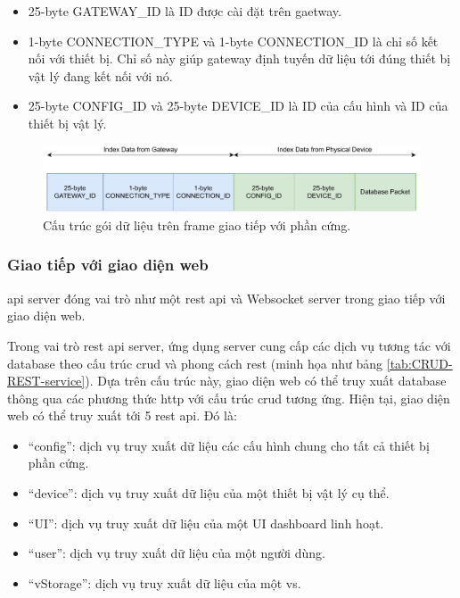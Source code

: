 \begin{itemize}
    \item 25-byte GATEWAY\_ID là ID được cài đặt trên gaetway.
    \item 1-byte CONNECTION\_TYPE và 1-byte CONNECTION\_ID là chỉ số kết nối với thiết bị. Chỉ số này giúp gateway định tuyến dữ liệu tới đúng thiết bị vật lý đang kết nối với nó.
    \item 25-byte CONFIG\_ID và 25-byte DEVICE\_ID là ID của cấu hình và ID của thiết bị vật lý.
\end{itemize}

\begin{figure}[htp]
\centering
\includegraphics[width=1.0\linewidth]{images/Thesis-Page-12-Hardware-data-frame-struct.pdf}
\caption{Cấu trúc gói dữ liệu trên frame giao tiếp với phần cứng.}
\label{fig:Hardware-data-frame-struct}
\end{figure}

\subsubsection{Giao tiếp với giao diện web}

\acrshort{api} server đóng vai trò như một \acrfull{rest} \acrshort{api} và Websocket server trong giao tiếp với giao diện web.

Trong vai trò \acrshort{rest} \acrshort{api} server, ứng dụng server cung cấp các dịch vụ tương tác với database theo cấu trúc \acrfull{crud} và phong cách \acrshort{rest} (minh họa như bảng \ref{tab:CRUD-REST-service}). Dựa trên cấu trúc này, giao diện web có thể truy xuất database thông qua các phương thức \acrshort{http} với cấu trúc \acrshort{crud} tương ứng. Hiện tại, giao diện web có thể truy xuất tới 5 \acrshort{rest} \acrshort{api}. Đó là:

\begin{itemize}
    \item ``config'': dịch vụ truy xuất dữ liệu các cấu hình chung cho tất cả thiết bị phần cứng.
    \item ``device'': dịch vụ truy xuất dữ liệu của một thiết bị vật lý cụ thể.
    \item ``UI'': dịch vụ truy xuất dữ liệu của một UI dashboard linh hoạt.
    \item ``user'': dịch vụ truy xuất dữ liệu của một người dùng.
    \item ``vStorage'': dịch vụ truy xuất dữ liệu của một \acrshort{vs}.
\end{itemize}

